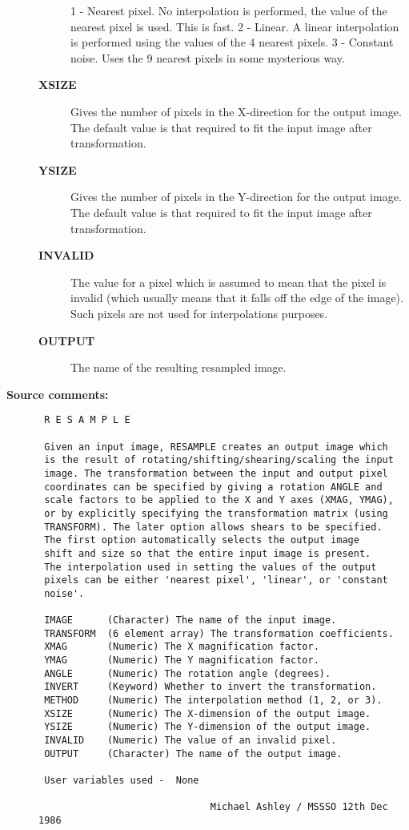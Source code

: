 \begin{description}
\begin{description}
    1 - Nearest pixel. No interpolation is performed, the
        value of the nearest pixel is used. This is fast.
    2 - Linear. A linear interpolation is performed using
        the values of the 4 nearest pixels.
    3 - Constant noise. Uses the 9 nearest pixels in some
        mysterious way.
\item [{\bf XSIZE}]
 Gives the number of pixels in the X-direction
 for the output image. The default value is that
 required to fit the input image after transformation.
\item [{\bf YSIZE}]
 Gives the number of pixels in the Y-direction
 for the output image. The default value is that
 required to fit the input image after transformation.
\item [{\bf INVALID}]
 The value for a pixel which is assumed to mean that
 the pixel is invalid (which usually means that it
 falls off the edge of the image). Such pixels are
 not used for interpolations purposes.
\item [{\bf OUTPUT}]
 The name of the resulting resampled image.
\end{description}

\item [{\bf Source comments:}]
\begin{verbatim}
 R E S A M P L E

 Given an input image, RESAMPLE creates an output image which
 is the result of rotating/shifting/shearing/scaling the input
 image. The transformation between the input and output pixel
 coordinates can be specified by giving a rotation ANGLE and
 scale factors to be applied to the X and Y axes (XMAG, YMAG),
 or by explicitly specifying the transformation matrix (using
 TRANSFORM). The later option allows shears to be specified.
 The first option automatically selects the output image
 shift and size so that the entire input image is present.
 The interpolation used in setting the values of the output
 pixels can be either 'nearest pixel', 'linear', or 'constant
 noise'.

 IMAGE      (Character) The name of the input image.
 TRANSFORM  (6 element array) The transformation coefficients.
 XMAG       (Numeric) The X magnification factor.
 YMAG       (Numeric) The Y magnification factor.
 ANGLE      (Numeric) The rotation angle (degrees).
 INVERT     (Keyword) Whether to invert the transformation.
 METHOD     (Numeric) The interpolation method (1, 2, or 3).
 XSIZE      (Numeric) The X-dimension of the output image.
 YSIZE      (Numeric) The Y-dimension of the output image.
 INVALID    (Numeric) The value of an invalid pixel.
 OUTPUT     (Character) The name of the output image.

 User variables used -  None

                              Michael Ashley / MSSSO 12th Dec 1986
\end{verbatim}
\end{description}
